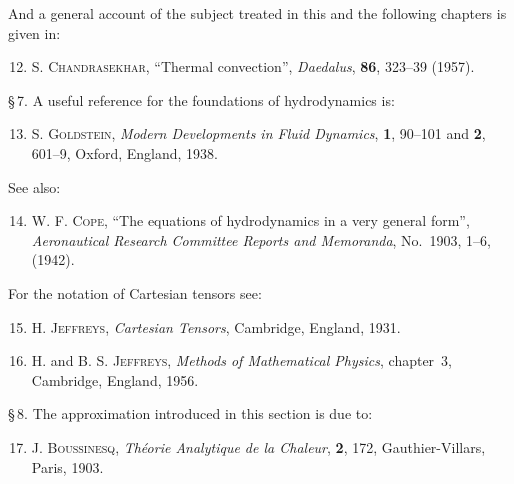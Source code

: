 \noindent And a general account of the subject treated in this and the following chapters
is given in:

\begin{enumerate}
\setcounter{enumi}{11}

\item \textsc{S. Chandrasekhar}, ``Thermal convection'', \textit{Daedalus},
  \textbf{86}, 323--39 (1957).

\end{enumerate}

\noindent \S\,7. A useful reference for the foundations of hydrodynamics is:

\begin{enumerate}
\setcounter{enumi}{12}

\item \textsc{S. Goldstein}, \textit{Modern Developments in Fluid Dynamics},
  \textbf{1}, 90--101 and \textbf{2}, 601--9, Oxford, England, 1938.

\end{enumerate}

\noindent See also:

\begin{enumerate}
\setcounter{enumi}{13}

\item \textsc{W. F. Cope}, ``The equations of hydrodynamics in a very general form'',
  \textit{Aeronautical Research Committee Reports and Memoranda}, No.~1903, 1--6,
  (1942).

\end{enumerate}

\noindent For the notation of Cartesian tensors see:

\begin{enumerate}
\setcounter{enumi}{14}

\item \textsc{H. Jeffreys}, \textit{Cartesian Tensors}, Cambridge, England, 1931.

\item \textsc{H.} and \textsc{B. S. Jeffreys}, \textit{Methods of Mathematical Physics},
  chapter~3, Cambridge, England, 1956.

\end{enumerate}

\noindent \S\,8. The approximation introduced in this section is due to:

\begin{enumerate}
\setcounter{enumi}{16}

\item \textsc{J. Boussinesq}, \textit{Th\'eorie Analytique de la Chaleur}, \textbf{2},
  172, Gauthier-Villars, Paris, 1903.

\end{enumerate}

